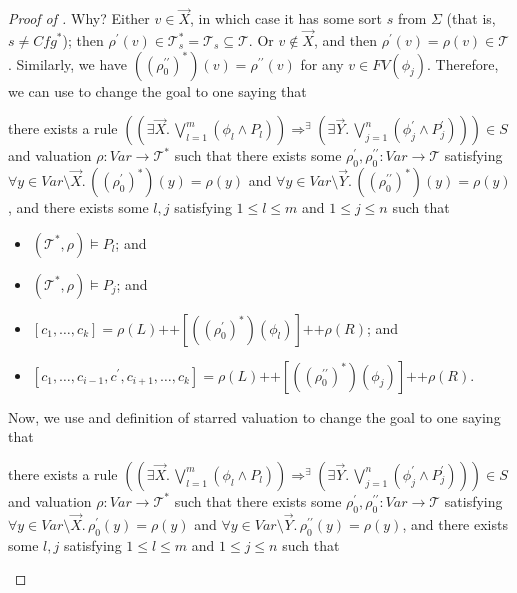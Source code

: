 \documentclass{article}
\newenvironment{proofenv}
  {
    \VerbatimEnvironment\begin{tcolorbox}[colback=black!0!white] %
  }
  {
   \end{tcolorbox}
  }
\begin{document}
\begin{proof}[Proof of ]
Why? Either $v \in \vec{X}$, in which case it has some sort $s$ from $\Sigma$
(that is, $s \not = \mathit{Cfg}^*$);
then $\rho^\prime(v) \in \mathcal{T}^*_s = \mathcal{T}_s \subseteq \mathcal{T}$.
Or $v \not\in \vec{X}$, and then $\rho^\prime(v) = \rho(v) \in \mathcal{T}$.
Similarly, we have
$((\rho_0^{\prime\prime})^*)(v) = \rho^{\prime\prime}(v)$
for any $v \in \mathit{FV}(\phi_j)$.
Therefore, we can use  to change the goal to one saying that
\begin{proofenv}
there exists a rule $((\exists \vec{X}.\, \bigvee_{l=1}^{m} (\phi_l \land P_l)) \Rightarrow^\exists (\exists \vec{Y}.\, \bigvee_{j=1}^{n} (\phi^\prime_j \land P^\prime_j))) \in S$
and valuation $\rho : \mathit{Var} \to \mathcal{T}^*$ such that
there exists some $\rho_0^\prime,\rho_0^{\prime\prime} : \mathit{Var} \to \mathcal{T}$
satisfying $\forall y \in \mathit{Var} \setminus \vec{X}.\, ((\rho_0^\prime)^*)(y) = \rho(y)$
and $\forall y \in \mathit{Var} \setminus \vec{Y}.\, ((\rho_0^{\prime\prime})^*)(y) = \rho(y)$,
and there exists some $l,j$ satisfying $1 \leq l \leq m$ and $1 \leq j \leq n$ such that
\begin{itemize}
    \item $(\mathcal{T}^*, \rho) \vDash P_l$; and
    \item $(\mathcal{T}^*, \rho) \vDash P_j$; and
    \item $[c_1,\ldots,c_k] = \rho(L) \texttt{++} [((\rho_0^\prime)^*)(\phi_l)] \texttt{++} \rho(R)$; and
    \item $[c_1, \ldots, c_{i-1}, c^\prime, c_{i+1}, \ldots, c_k] = \rho(L)
    \texttt{++} [((\rho_0^{\prime\prime})^*)(\phi_j)] 
    \texttt{++} \rho(R)$.
\end{itemize}
\end{proofenv}
Now, we use  and definition of starred valuation to change the goal to one saying that
\begin{proofenv}
there exists a rule $((\exists \vec{X}.\, \bigvee_{l=1}^{m} (\phi_l \land P_l)) \Rightarrow^\exists (\exists \vec{Y}.\, \bigvee_{j=1}^{n} (\phi^\prime_j \land P^\prime_j))) \in S$
and valuation $\rho : \mathit{Var} \to \mathcal{T}^*$ such that
there exists some $\rho_0^\prime,\rho_0^{\prime\prime} : \mathit{Var} \to \mathcal{T}$
satisfying $\forall y \in \mathit{Var} \setminus \vec{X}.\, \rho_0^\prime(y) = \rho(y)$
and $\forall y \in \mathit{Var} \setminus \vec{Y}.\, \rho_0^{\prime\prime}(y) = \rho(y)$,
and there exists some $l,j$ satisfying $1 \leq l \leq m$ and $1 \leq j \leq n$ such that
\begin{itemize}

\end{itemize}
\end{proofenv}
\end{proof}
\end{document}
